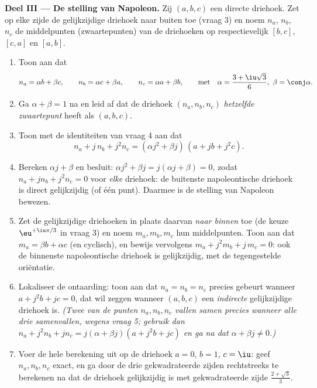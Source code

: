 \begin{problem}
\medskip
\noindent\textbf{Deel III --- De stelling van Napoleon.} Zij $(a, b, c)$
een directe driehoek. Zet op elke zijde de gelijkzijdige driehoek naar
buiten toe (vraag 3) en noem $n_a$, $n_b$, $n_c$ de middelpunten
(zwaartepunten) van de driehoeken op respectievelijk $[b, c]$, $[c, a]$
en $[a, b]$.
\begin{enumerate}[resume]
  \item Toon aan dat
        \[
        n_a = \alpha b + \beta c, \qquad
        n_b = \alpha c + \beta a, \qquad
        n_c = \alpha a + \beta b,
        \qquad\text{met}\quad
        \alpha = \frac{3 + \iu\sqrt3}{6},\ \beta = \conj\alpha .
        \]
  \item Ga $\alpha + \beta = 1$ na en leid af dat de driehoek $(n_a,
        n_b, n_c)$ \emph{hetzelfde zwaartepunt} heeft als $(a, b, c)$.
  \item Toon met de identiteiten van vraag 4 aan dat
        \[
        n_a + j\,n_b + j^2 n_c
        = (\alpha j^2 + \beta j)\,(a + jb + j^2c) .
        \]
  \item Bereken $\alpha j + \beta$ en besluit: $\alpha j^2 + \beta j =
        j(\alpha j + \beta) = 0$, zodat $n_a + j n_b + j^2 n_c = 0$ voor
        \emph{elke} driehoek: de buitenste napoleontische driehoek is
        direct gelijkzijdig (of één punt). Daarmee is de stelling van
        Napoleon bewezen.
  \item Zet de gelijkzijdige driehoeken in plaats daarvan \emph{naar
        binnen} toe (de keuze $\eu^{+\iu\pi/3}$ in vraag 3) en noem
        $m_a, m_b, m_c$ hun middelpunten. Toon aan dat $m_a = \beta b +
        \alpha c$ (en cyclisch), en bewijs vervolgens $m_a + j^2 m_b +
        j\,m_c = 0$: ook de binnenste napoleontische driehoek is
        gelijkzijdig, met de tegengestelde oriëntatie.
  \item Lokaliseer de ontaarding: toon aan dat $n_a = n_b = n_c$ precies
        gebeurt wanneer $a + j^2 b + jc = 0$, dat wil zeggen wanneer
        $(a, b, c)$ een \emph{indirecte} gelijkzijdige driehoek is.
        \emph{(Twee van de punten $n_a, n_b, n_c$ vallen samen precies
        wanneer alle drie samenvallen, wegens vraag 5; gebruik dan $n_a
        + j^2 n_b + j n_c = j(\alpha + \beta j)(a + j^2b + jc)$ en ga na
        dat $\alpha + \beta j \neq 0$.)}
  \item Voer de hele berekening uit op de driehoek $a = 0$, $b = 1$, $c
        = \iu$: geef $n_a, n_b, n_c$ exact, en ga door de drie
        gekwadrateerde zijden rechtstreeks te berekenen na dat de
        driehoek gelijkzijdig is met gekwadrateerde zijde
        $\frac{2 + \sqrt3}{3}$.
\end{enumerate}


\end{problem}
